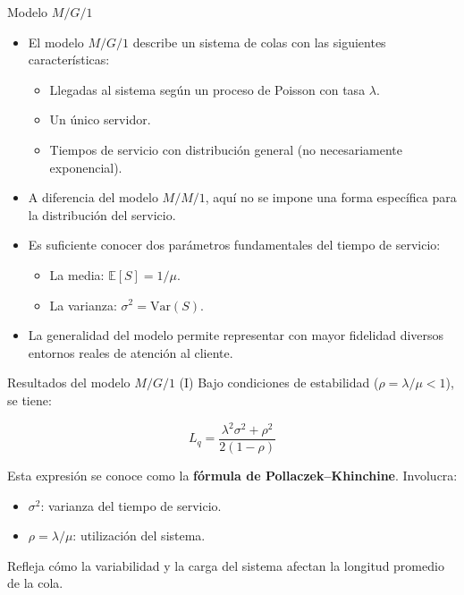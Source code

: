 \documentclass{beamer}
\begin{document}
\begin{frame}{Modelo \texorpdfstring{$M/G/1$}{M/G/1}}
  \begin{itemize}
    \item El modelo $M/G/1$ describe un sistema de colas con las siguientes características: \pause
    \begin{itemize}
      \item Llegadas al sistema según un proceso de Poisson con tasa \( \lambda \). \pause
      \item Un único servidor. \pause
      \item Tiempos de servicio con distribución general (no necesariamente exponencial). \pause
    \end{itemize}

    \item A diferencia del modelo \( M/M/1 \), aquí no se impone una forma específica para la distribución del servicio. \pause

    \item Es suficiente conocer dos parámetros fundamentales del tiempo de servicio: \pause
    \begin{itemize}
      \item La media: \( \mathbb{E}[S] = 1/\mu \). \pause
      \item La varianza: \( \sigma^2 = \mathrm{Var}(S) \). \pause
    \end{itemize}
    
    \item La generalidad del modelo permite representar con mayor fidelidad diversos entornos reales de atención al cliente.
  \end{itemize}
\end{frame}

\begin{frame}{Resultados del modelo \texorpdfstring{$M/G/1$}{M/G/1} (I)}
  Bajo condiciones de estabilidad (\( \rho = \lambda/\mu < 1 \)), se tiene:

  \pause
  \[
  L_q = \frac{\lambda^2 \sigma^2 + \rho^2}{2(1 - \rho)}
  \]

  \pause
  Esta expresión se conoce como la \textbf{fórmula de Pollaczek–Khinchine}. Involucra:
  \begin{itemize}
    \item \( \sigma^2 \): varianza del tiempo de servicio.
    \item \( \rho = \lambda/\mu \): utilización del sistema.
  \end{itemize}
  \pause
  Refleja cómo la variabilidad y la carga del sistema afectan la longitud promedio de la cola.
\end{frame}
\end{document}
